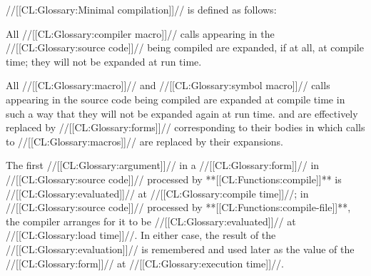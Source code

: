 \endsubsubsubsection%

\endsubsubsection%








//[[CL:Glossary:Minimal compilation]]// is defined as follows:

\beginlist 
{}








\itemitem{\bull} All //[[CL:Glossary:compiler macro]]// calls appearing in the
//[[CL:Glossary:source code]]// being compiled are expanded, if at all, at compile time;
they will not be expanded at run time.



 \itemitem{\bull} All //[[CL:Glossary:macro]]// and 
//[[CL:Glossary:symbol macro]]// calls
appearing in the source code being compiled are expanded at compile time
in such a way that they will not be expanded again at run time.
and
are effectively replaced by
//[[CL:Glossary:forms]]// corresponding to their bodies in which calls to 
//[[CL:Glossary:macros]]// are replaced by their expansions.
 

\itemitem{\bull} 
The first //[[CL:Glossary:argument]]// in a 
//[[CL:Glossary:form]]// 
in //[[CL:Glossary:source code]]// processed by **[[CL:Functions:compile]]**
is //[[CL:Glossary:evaluated]]// at //[[CL:Glossary:compile time]]//;
in //[[CL:Glossary:source code]]// processed by **[[CL:Functions:compile-file]]**, 
the compiler arranges for it to be //[[CL:Glossary:evaluated]]// at //[[CL:Glossary:load time]]//.
In either case, the result of the //[[CL:Glossary:evaluation]]//
is remembered and used later as the value of the 
 //[[CL:Glossary:form]]// at //[[CL:Glossary:execution time]]//.







\endlist
 
\endsubsubsection%

